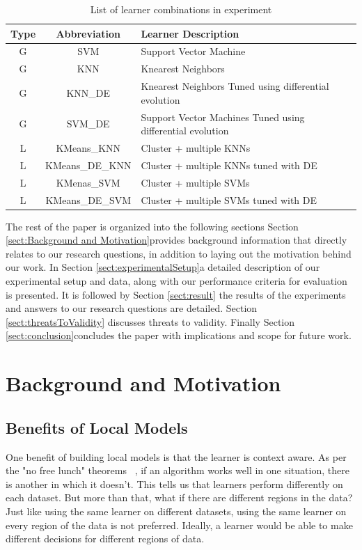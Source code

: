 \documentclass[sigconf]{acmart}
\theoremstyle{break}
\newcommand{\tion}[1]{{Section }\ref{sect:#1}}
\begin{document}
    \begin{table}[h!]
        \centering
        \begin{tabular}{c|c|p{4cm}}
            \textbf{Type} & \textbf{Abbreviation} & \textbf{Learner Description}\\
            \hline
            G & SVM & Support Vector Machine \\
            \hline
            G & KNN & K\-nearest Neighbors \\
            \hline
            G & KNN\_DE & K\-nearest Neighbors Tuned using differential evolution \\
            \hline
            G & SVM\_DE & Support Vector Machines Tuned using differential evolution \\
            \hline
            L & K\-Means\_KNN & Cluster + multiple KNNs \\
            \hline
            L & K\-Means\_DE\_KNN & Cluster + multiple KNNs tuned with DE \\
            \hline
            L & K\-Menas\_SVM & Cluster + multiple SVMs \\
            \hline
            L & K\-Means\_DE\_SVM & Cluster + multiple SVMs tuned with DE \\
            \hline
        \end{tabular}
        \caption{List of learner combinations in experiment}
        \label{tab:learners}
    \end{table}
    The rest of the paper is organized into the following sections
    \tion{Background and Motivation}provides background information  that directly relates to our research questions, in addition to laying out the motivation behind our work. In 
    \tion{experimentalSetup}a detailed description of our experimental setup and data, along with our performance criteria for evaluation is presented. It is followed by 
    \tion{result} the results of the experiments and answers to our research questions are detailed.
    \tion{threatsToValidity} discusses threats to validity. Finally 
    \tion{conclusion}concludes the paper with implications and scope for future work.
\section{Background and Motivation}
\label{sect: Background and Motivation}
    
    \subsection{Benefits of Local Models}
    \label{sssec:Benefits of Local Models}
    One benefit of building local models is that the learner is context aware. As per the "no free lunch" theorems ~\cite{wolpert1997no}, if an algorithm works well in one situation, there is another in which it doesn't. This tells us that learners perform differently on each dataset. But more than that, what if there are different regions in the data? Just like using the same learner on different datasets, using the same learner on every region of the data is not preferred. Ideally, a learner would be able to make different decisions for different regions of data.
    
\end{document}
